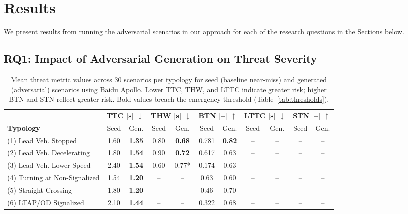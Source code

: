 \section{Results}
We present results from running the adversarial scenarios in our approach for each of the research questions in the Sections below. 

\subsection{RQ1: Impact of Adversarial Generation on Threat Severity}
\begin{table}[t]
\centering
\caption{Mean threat metric values across 30 scenarios per typology for seed (baseline near-miss) and generated (adversarial) scenarios using Baidu Apollo. Lower TTC, THW, and LTTC indicate greater risk; higher BTN and STN reflect greater risk. Bold values breach the emergency threshold (Table~\ref{tab:thresholds}).}
\label{tab:rq1_threat_comparison}
\renewcommand{\arraystretch}{1.0}
\begin{tabular}{@{}l cc cc cc cc cc@{}}
\toprule
& \multicolumn{2}{c}{\textbf{TTC [s] $\downarrow$}} & \multicolumn{2}{c}{\textbf{THW [s] $\downarrow$}} & \multicolumn{2}{c}{\textbf{BTN [--] $\uparrow$}} & \multicolumn{2}{c}{\textbf{LTTC [s] $\downarrow$}} & \multicolumn{2}{c}{\textbf{STN [--] $\uparrow$}} \\
\cmidrule(lr){2-3} \cmidrule(lr){4-5} \cmidrule(lr){6-7} \cmidrule(lr){8-9} \cmidrule(lr){10-11}
\textbf{Typology} & Seed & Gen. & Seed & Gen. & Seed & Gen. & Seed & Gen. & Seed & Gen. \\
\midrule
\rowcolor{blue!5}
(1) Lead Veh. Stopped         & 1.60 & \textbf{1.35} & 0.80 & \textbf{0.68} & 0.781 & \textbf{0.82} & -- & -- & -- & -- \\
\rowcolor{blue!5}
(2) Lead Veh. Decelerating    & 1.80 & \textbf{1.54} & 0.90 & \textbf{0.72} & 0.617 & 0.63 & -- & -- & -- & -- \\
\rowcolor{blue!5}
(3) Lead Veh. Lower Speed     & 2.40 & \textbf{1.54} & 0.60 & 0.77* & 0.174 & 0.63 & -- & -- & -- & -- \\
\rowcolor{green!5}
(4) Turning at Non-Signalized  & 1.54 & \textbf{1.20} & -- & -- & 0.63 & 0.60 & -- & -- & -- & -- \\
\rowcolor{green!5}
(5) Straight Crossing          & 1.80 & \textbf{1.20} & -- & -- & 0.46 & 0.70 & -- & -- & -- & -- \\
\rowcolor{green!5}
(6) LTAP/OD Signalized         & 2.10 & \textbf{1.44} & -- & -- & 0.322 & 0.68 & -- & -- & -- & -- \\

\end{tabular}
\end{table}
